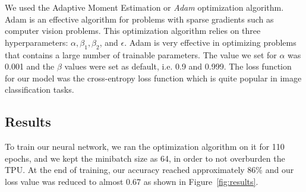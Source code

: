 \documentclass[11pt]{article}
\begin{document}
  We used the Adaptive Moment Estimation or \textit{Adam} optimization algorithm. Adam is an 
  effective algorithm for problems with sparse gradients such as computer vision problems. 
  This optimization algorithm relies on three hyperparameters: $\alpha, \beta_1, \beta_2 $, and $\epsilon$.
  Adam is very effective in optimizing problems that contains a large number 
  of trainable parameters. The value we set for $\alpha$ was 0.001 and the $\beta$ values 
  were set as default, i.e. 0.9 and 0.999. The loss function for our model was 
  the cross-entropy loss function which is quite popular in image classification tasks.
   
  \subsection{Results}
  To train our neural network, we ran the optimization algorithm on it for 
  110 epochs, and we kept the minibatch size as 64, in order to not overburden the TPU.
  At the end of training, our accuracy reached approximately 86\% and our loss value 
  was reduced to almost 0.67 as shown in Figure~\ref{fig:results}.
\end{document}
